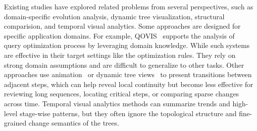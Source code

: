 Existing studies have explored related problems from several perspectives, such as domain-specific evolution analysis, dynamic tree visualization, structural comparision, and temporal visual analytics. Some approaches are designed for specific application domains. For example, QOVIS~\cite{} supports the analysis of query
optimization process by leveraging domain knowledge. While such systems are effective in their target settings like the optimization rules. They rely on strong domain assumptions and are difficult to generalize to other tasks. Other approaches use animation~\cite{} or dynamic tree views~\cite{} to present transitions between adjacent steps, which can help reveal local continuity but become less effective for reviewing long sequences, locating critical steps, or comparing sparse changes across time. Temporal visual analytics methods can summarize trends and high-level stage-wise patterns, but they often ignore the topological structure and fine-grained change semantics of the trees. 





